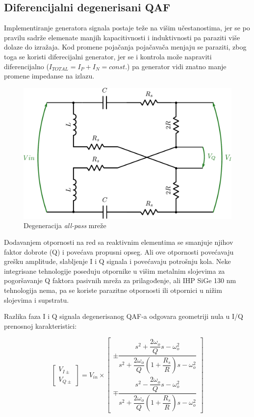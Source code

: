 \documentclass[journal,twocolumn,letterpaper]{IEEEJERM}
\begin{document}
\subsection{Diferencijalni degenerisani QAF}

Implementiranje generatora signala postaje teže na višim učestanostima, jer se po pravilu sadrže elemenate manjih kapacitivnosti i induktivnosti pa paraziti više dolaze do izražaja. Kod promene pojačanja pojačavača menjaju se paraziti, zbog toga se koristi diferecijalni generator, jer se i kontrola može napraviti diferencijalno ($I_{TOTAL}=I_{P}+I_{N}=const.$) pa generator vidi znatno manje promene impedanse na izlazu.

\begin{figure}[!htbp]
  \centering
  \includegraphics[width=\linewidth]{qaf_diff_degen.pdf}
  \caption{Degeneracija \textit{all-pass} mreže}
  \label{fig:qaf_diff_degen}
\end{figure}

Dodavanjem otpornosti na red sa reaktivnim elementima se smanjuje njihov faktor dobrote (Q) i povećava propusni opseg. Ali ove otpornosti povećavaju grešku amplitude, slabljenje I i Q signala i povećavaju potrošnju kola. Neke integrisane tehnologije poseduju otpornike u višim metalnim slojevima za pogoršavanje Q faktora pasivnih mreža za prilagođenje, ali IHP SiGe 130 nm tehnologija nema, pa se koriste parazitne otpornosti ili otpornici u nižim slojevima i supstratu.

Razlika faza I i Q signala degenerisanog QAF-a odgovara geometriji nula u I/Q prenosnoj karakteristici:

\[
\begin{bmatrix}
    V_{I\pm}      \\
    V_{Q\pm}    
\end{bmatrix}   
=
V_{in} \times
\begin{bmatrix}
    \pm \dfrac{s^2 + \dfrac{2\omega_{o}}{Q} s - \omega_{o}^2}{s^2 + \dfrac{2\omega_{o}}{Q}(1+\dfrac{R_s}{R}) s - \omega_{o}^2} \\
    \mp \dfrac{s^2 - \dfrac{2\omega_{o}}{Q} s - \omega_{o}^2}{s^2 + \dfrac{2\omega_{o}}{Q}(1+\dfrac{R_s}{R}) s - \omega_{o}^2}
\end{bmatrix}
\]
\end{document}
